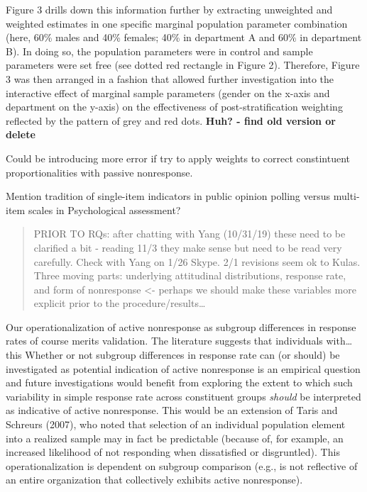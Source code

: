 \documentclass[
  man,mask]{apa7}
\begin{document}
Figure 3 drills down this information further by extracting unweighted and weighted estimates in one specific marginal population parameter combination (here, 60\% males and 40\% females; 40\% in department A and 60\% in department B). In doing so, the population parameters were in control and sample parameters were set free (see dotted red rectangle in Figure 2). Therefore, Figure 3 was then arranged in a fashion that allowed further investigation into the interactive effect of marginal sample parameters (gender on the x-axis and department on the y-axis) on the effectiveness of post-stratification weighting reflected by the pattern of grey and red dots. \textbf{Huh? - find old version or delete}

Could be introducing more error if try to apply weights to correct constintuent proportionalities with passive nonresponse.

Mention tradition of single-item indicators in public opinion polling versus multi-item scales in Psychological assessment?

\begin{quote}
PRIOR TO RQs: after chatting with Yang (10/31/19) these need to be clarified a bit - reading 11/3 they make sense but need to be read very carefully. Check with Yang on 1/26 Skype. 2/1 revisions seem ok to Kulas. Three moving parts: underlying attitudinal distributions, response rate, and form of nonresponse \textless- perhaps we should make these variables more explicit prior to the procedure/results\ldots{}
\end{quote}

Our operationalization of active nonresponse as subgroup differences in response rates of course merits validation. The literature suggests that individuals with\ldots{} this
Whether or not subgroup differences in response rate can (or should) be investigated as potential indication of active nonresponse is an empirical question and future investigations would benefit from exploring the extent to which such variability in simple response rate across constituent groups \emph{should} be interpreted as indicative of active nonresponse. This would be an extension of Taris and Schreurs (2007), who noted that selection of an individual population element into a realized sample may in fact be predictable (because of, for example, an increased likelihood of not responding when dissatisfied or disgruntled). This operationalization is dependent on subgroup comparison (e.g., is not reflective of an entire organization that collectively exhibits active nonresponse).
\end{document}
